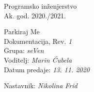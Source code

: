 \documentclass[12pt]{report}
\begin{document}
 
	
	
	
	\begin{titlepage}
		\begin{center}
			\LARGE Programsko inženjerstvo\\
			\large Ak. god. 2020./2021.\\
			
			
			\huge Parkiraj Me\\
			\Large Dokumentacija, Rev. \textit{1}\\
			
			\normalsize
			Grupa: \textit{seVen}\\
			Voditelj: \textit{Marin Ćubela}\\
			
			
			Datum predaje: \textit{13. 11. 2020}\\
			
			
			Nastavnik: \textit{Nikolina Frid}\\
			
		\end{center}
		
		
	\end{titlepage}
	
	
	\tableofcontents
	
	
	
	
	
	
	
	
	
	
	\begingroup
	\renewcommand*\listfigurename{Indeks slika i dijagrama}
	\listoffigures
	\endgroup
	
	
	
	\eject 
	
	
	
	
\end{document}
